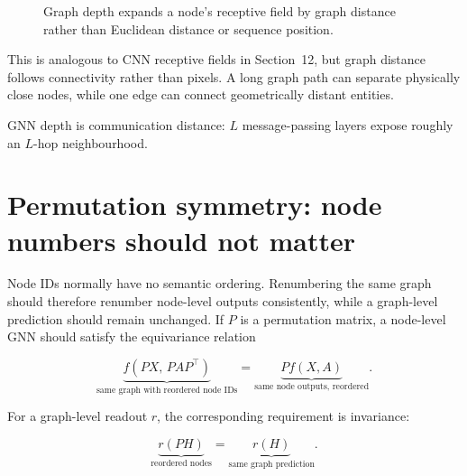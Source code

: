 \begin{figure}[htbp]
\centering
{}
\caption{Graph depth expands a node's receptive field by graph distance rather than Euclidean distance or sequence position.}
\label{fig:gnn-receptive-field}
\end{figure}

This is analogous to CNN receptive fields in Section~12, but graph distance follows connectivity rather than pixels.
A long graph path can separate physically close nodes, while one edge can connect geometrically distant entities.

\begin{calloutintuition}
GNN depth is communication distance: $L$ message-passing layers expose roughly an $L$-hop neighbourhood.
\end{calloutintuition}

\section{Permutation symmetry: node numbers should not matter}
Node IDs normally have no semantic ordering.
Renumbering the same graph should therefore renumber node-level outputs consistently, while a graph-level prediction should remain unchanged.
If $P$ is a permutation matrix, a node-level GNN should satisfy the equivariance relation

\[
\underbrace{f(PX,\,PAP^\top)}_{\text{same graph with reordered node IDs}}
=
\underbrace{P f(X,A)}_{\text{same node outputs, reordered}}.
\]

For a graph-level readout $r$, the corresponding requirement is invariance:

\[
\underbrace{r(PH)}_{\text{reordered nodes}}
=
\underbrace{r(H)}_{\text{same graph prediction}}.
\]

